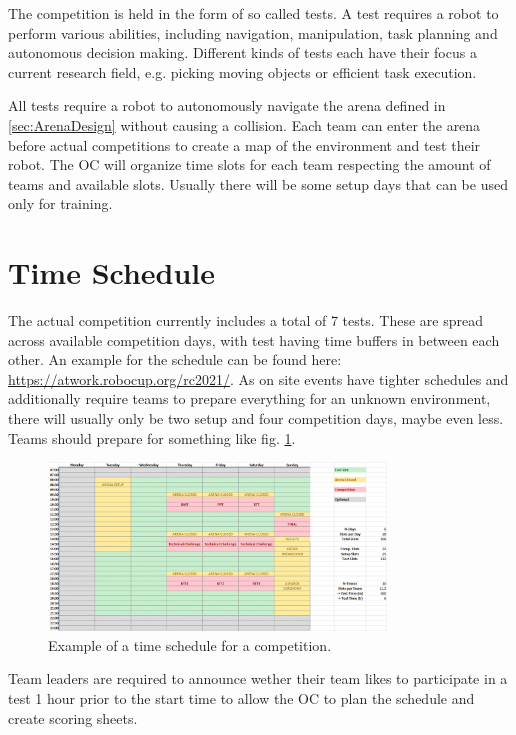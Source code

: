\label{sec:Competition}

The competition is held in the form of so called tests.
A test requires a robot to perform various abilities, including navigation, manipulation, task planning and autonomous decision making.
Different kinds of tests each have their focus a current research field, e.g. picking moving objects or efficient task execution.

All tests require a robot to autonomously navigate the arena defined in \ref{sec:ArenaDesign} without causing a collision. Each team can enter the arena before actual competitions to create a map of the environment and test their robot. The OC will organize time slots for each team respecting the amount of teams and available slots. Usually there will be some setup days that can be used only for training.

\section{Time Schedule}

The actual competition currently includes a total of 7 tests.
These are spread across available competition days, with test having time buffers in between each other.
An example for the schedule can be found here: \url{https://atwork.robocup.org/rc2021/}.
As on site events have tighter schedules and additionally require teams to prepare everything for an unknown environment, there will usually only be two setup and four competition days, maybe even less.
Teams should prepare for something like fig. \ref{fig:example_schedule}. 

\begin{figure}[h!]
\centering
\includegraphics[width= 0.8\textwidth ]{./images/competition/example_schedule}
\caption{Example of a time schedule for a \RCAW competition.}
\label{fig:example_schedule}
\end{figure}

Team leaders are required to announce wether their team likes to participate in a test 1 hour prior to the start time to allow the OC to plan the schedule and create scoring sheets.


